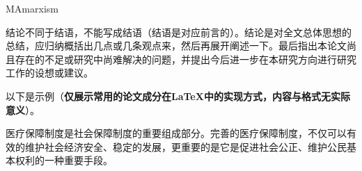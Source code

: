 
\begin{conclusion}{MAmarxism}

结论不同于结语，不能写成结语（结语是对应前言的）。结论是对全文总体思想的总结，应归纳概括出几点或几条观点来，然后再展开阐述一下。最后指出本论文尚且存在的不足或研究中尚难解决的问题，并提出今后进一步在本研究方向进行研究工作的设想或建议。

以下是示例（{\bf 仅展示常用的论文成分在LaTeX中的实现方式，内容与格式无实际意义}）。

医疗保障制度是社会保障制度的重要组成部分。完善的医疗保障制度，不仅可以有效的维护社会经济安全、稳定的发展，更重要的是它是促进社会公正、维护公民基本权利的一种重要手段。

\end{conclusion}


